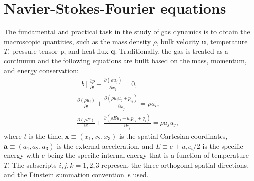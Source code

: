 \section{Navier-Stokes-Fourier equations}




The fundamental and practical task in the study of gas dynamics is to obtain the macroscopic quantities, such as the mass density $\rho$, bulk velocity $\bm{u}$, temperature $T$, pressure tensor
$\bm{p}$, and heat flux $\bm{q}$. Traditionally, the gas is treated as a continuum and the following equations are built based on the mass, momentum, and energy conservation:
\begin{equation}\label{macro}
\begin{aligned}[b]
\frac{\partial \rho}{\partial t}+\frac{\partial(\rho{}u_j) }{\partial x_j}=0, \\
\frac{\partial (\rho{u_i})}{\partial t}+\frac{\partial (\rho{}u_iu_j+p_{ij})}{\partial x_j}= \rho{}a_i,\\
\frac{\partial \left(\rho{}E\right)}{\partial t}+\frac{\partial \left(\rho{}{E}u_j+u_i{p}_{ij}+q_j\right)}{\partial x_j}=\rho{}a_ju_j,
\end{aligned}
\end{equation} 
where $t$ is the time, $\bm{x}\equiv(x_1,x_2,x_3)$ is the spatial Cartesian coordinates, $\bm{a}\equiv(a_1,a_2,a_3)$ is the external acceleration, and $E\equiv{}e+u_iu_i/{2}$ is the specific energy with $e$ being the specific internal energy that is a function of temperature $T$. The subscripts $i,j,k=1,2,3$ represent the three orthogonal spatial directions, and the Einstein summation convention is used. 


